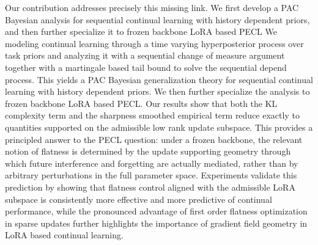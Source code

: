 \documentclass[10pt]{article} %
\begin{document}
Our contribution addresses precisely this missing link. We first develop a PAC Bayesian analysis for sequential continual learning with history dependent priors, and then further specialize it to frozen backbone LoRA based PECL
We modeling continual learning through a time varying hyperposterior process over task priors and analyzing it with a sequential change of measure argument together with a martingale based tail bound to solve the sequential depend process. This yields a PAC Bayesian generalization theory for sequential continual learning with history dependent priors. We then further specialize the analysis to frozen backbone LoRA based PECL. Our results show that both the KL complexity term and the sharpness smoothed empirical term reduce exactly to quantities supported on the admissible low rank update subspace. This provides a principled answer to the PECL question: under a frozen backbone, the relevant notion of flatness is determined by the update supporting geometry through which future interference and forgetting are actually mediated, rather than by arbitrary perturbations in the full parameter space. Experiments validate this prediction by showing that flatness control aligned with the admissible LoRA subspace is consistently more effective and more predictive of continual performance, while the pronounced advantage of first order flatness optimization in sparse updates further highlights the importance of gradient field geometry in LoRA based continual learning.



\end{document}
